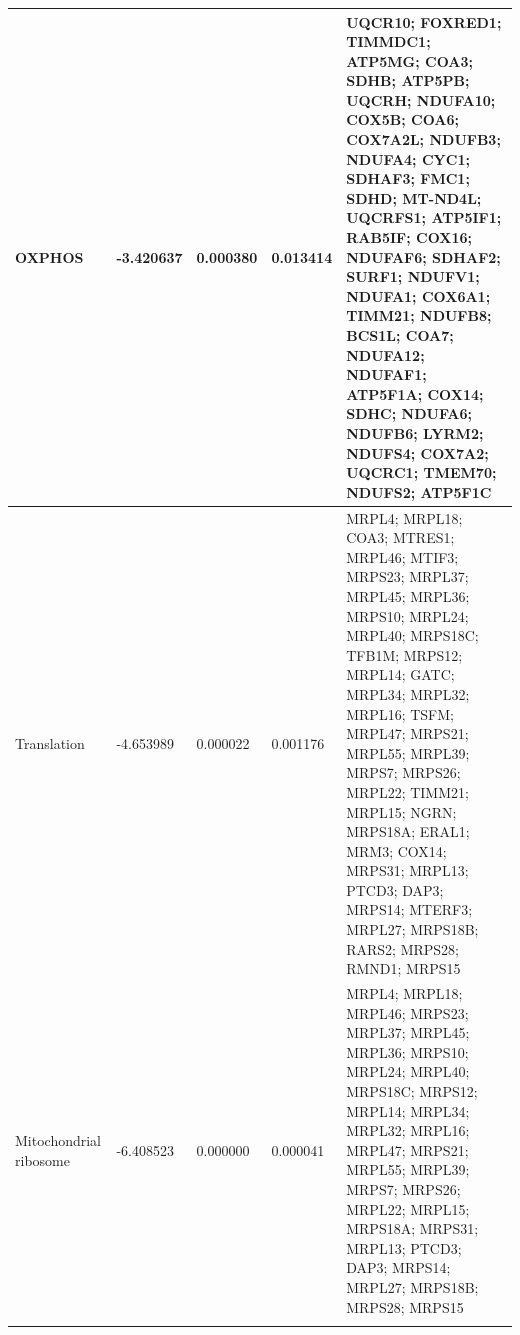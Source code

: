 \documentclass[12pt]{article}
\begin{document}
\begin{longtable}{p{5cm} p{2cm} p{1.5cm} p{1.5cm} p{7cm}}
    \hline
    OXPHOS & -3.420637 & 0.000380 & 0.013414 & UQCR10; FOXRED1; TIMMDC1; ATP5MG; COA3; SDHB; ATP5PB; UQCRH; NDUFA10; COX5B; COA6; COX7A2L; NDUFB3; NDUFA4; CYC1; SDHAF3; FMC1; SDHD; MT-ND4L; UQCRFS1; ATP5IF1; RAB5IF; COX16; NDUFAF6; SDHAF2; SURF1; NDUFV1; NDUFA1; COX6A1; TIMM21; NDUFB8; BCS1L; COA7; NDUFA12; NDUFAF1; ATP5F1A; COX14; SDHC; NDUFA6; NDUFB6; LYRM2; NDUFS4; COX7A2; UQCRC1; TMEM70; NDUFS2; ATP5F1C \\
    \hline
    Translation & -4.653989 & 0.000022 & 0.001176 & MRPL4; MRPL18; COA3; MTRES1; MRPL46; MTIF3; MRPS23; MRPL37; MRPL45; MRPL36; MRPS10; MRPL24; MRPL40; MRPS18C; TFB1M; MRPS12; MRPL14; GATC; MRPL34; MRPL32; MRPL16; TSFM; MRPL47; MRPS21; MRPL55; MRPL39; MRPS7; MRPS26; MRPL22; TIMM21; MRPL15; NGRN; MRPS18A; ERAL1; MRM3; COX14; MRPS31; MRPL13; PTCD3; DAP3; MRPS14; MTERF3; MRPL27; MRPS18B; RARS2; MRPS28; RMND1; MRPS15 \\
    \hline
    Mitochondrial ribosome & -6.408523 & 0.000000 & 0.000041 & MRPL4; MRPL18; MRPL46; MRPS23; MRPL37; MRPL45; MRPL36; MRPS10; MRPL24; MRPL40; MRPS18C; MRPS12; MRPL14; MRPL34; MRPL32; MRPL16; MRPL47; MRPS21; MRPL55; MRPL39; MRPS7; MRPS26; MRPL22; MRPL15; MRPS18A; MRPS31; MRPL13; PTCD3; DAP3; MRPS14; MRPL27; MRPS18B; MRPS28; MRPS15 \\
    \hline
    \label{tab:choline_mito_genes}
\end{longtable}
\end{document}
